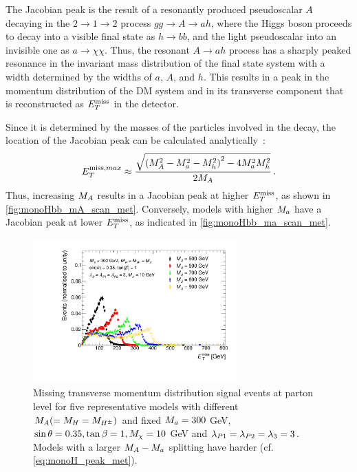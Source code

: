 The Jacobian peak is the result of a resonantly produced pseudoscalar $A$ decaying in the $2\to1\to2$ process $gg\to A\to a h$, 
where the Higgs boson proceeds to decay into a visible final state as $h\to b b$, and the light pseudoscalar into an invisible one as $a\to \chi\chi$. 
Thus, the resonant $A \to a h $  process has a sharply peaked resonance in the invariant mass distribution of the final state system with a  width determined by the widths of $a$, $A$, and $h$. This results in a peak in the momentum distribution of the DM system and in its transverse component that is reconstructed as $\MET$ in the detector.

Since it is determined by the masses of the particles involved in the decay, 
the location of the Jacobian peak can be calculated analytically~\cite{Bauer:2017ota}:
\begin{align}
E^{\mathrm{miss},max}_T \approx \frac{\sqrt{\left(M_{A}^2 -M_{a}^2 -M_{h}^2\right)^2 - 4 M_{a}^2 M_{h}^2}}{2M_{A}}\,.
\label{eq:monoH_peak_met}
\end{align}
Thus, increasing $\mA$ results in  a Jacobian peak at higher $\MET$, as shown in \autoref{fig:monoHbb_mA_scan_met}.
Conversely, models with higher $M_{a}$ have a Jacobian peak at lower $\MET$, as indicated in \autoref{fig:monoHbb_ma_scan_met}. 

\begin{figure}[tbp]
\centering
\includegraphics[width=0.7\textwidth]{texinputs/04_grid/figures/monoHbb_m_large_A_scan_MET_liny_norm2one.pdf}
\caption[$\MET$ distribution in  \monohbb events for different $\mA$]
{
Missing transverse momentum distribution  \monohbb signal events at parton level for five representative models with different $M_{A}(=M_{H}=M_{H^{\pm}})$
and fixed $M_{a} = 300$ GeV, $ \sin\theta = 0.35, \tan\beta = 1, M_{\chi} = 10$ GeV and $ \lambda_{P1} = \lambda_{P2} = \lambda_{3} = 3 $. 
Models with a larger $M_{A}-M_{a}$ splitting have harder \met (cf.  \autoref{eq:monoH_peak_met}). 
%
}
\label{fig:monoHbb_mA_scan_met}
\end{figure}


